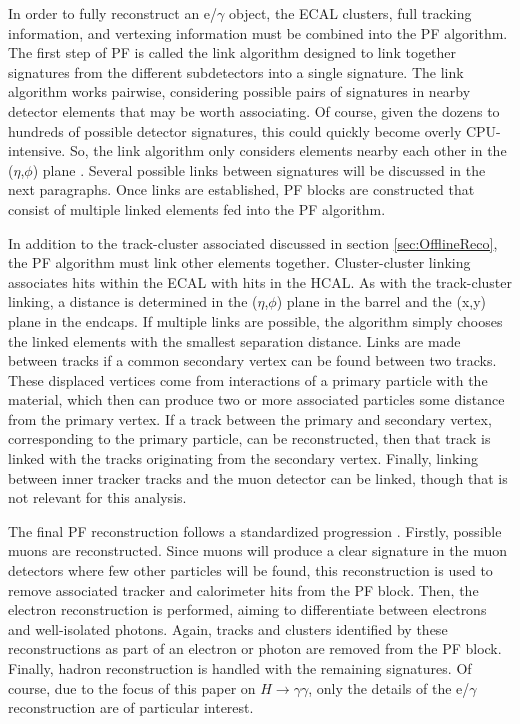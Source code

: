 \documentclass[12pt]{ucsddissertation}
\begin{document}
In order to fully reconstruct an e/$\gamma$ object, the ECAL clusters, full tracking information, and vertexing information must be combined into the PF algorithm. The first step of PF is called the link algorithm designed to link together signatures from the different subdetectors into a single signature. The link algorithm works pairwise, considering possible pairs of signatures in nearby detector elements that may be worth associating. Of course, given the dozens to hundreds of possible detector signatures, this could quickly become overly CPU-intensive. So, the link algorithm only considers elements nearby each other in the ($\eta$,$\phi$) plane \cite{ParticleFlow}. Several possible links between signatures will be discussed in the next paragraphs. Once links are established, PF blocks are constructed that consist of multiple linked elements fed into the PF algorithm.

In addition to the track-cluster associated discussed in section \ref{sec:OfflineReco}, the PF algorithm must link other elements together. Cluster-cluster linking associates hits within the ECAL with hits in the HCAL. As with the track-cluster linking, a distance is determined in the ($\eta$,$\phi$) plane in the barrel and the (x,y) plane in the endcaps. If multiple links are possible, the algorithm simply chooses the linked elements with the smallest separation distance. Links are made between tracks if a common secondary vertex can be found between two tracks. These displaced vertices come from interactions of a primary particle with the material, which then can produce two or more associated particles some distance from the primary vertex. If a track between the primary and secondary vertex, corresponding to the primary particle, can be reconstructed, then that track is linked with the tracks originating from the secondary vertex. Finally, linking between inner tracker tracks and the muon detector can be linked, though that is not relevant for this analysis.

The final PF reconstruction follows a standardized progression \cite{ParticleFlow}. Firstly, possible muons are reconstructed. Since muons will produce a clear signature in the muon detectors where few other particles will be found, this reconstruction is used to remove associated tracker and calorimeter hits from the PF block. Then, the electron reconstruction is performed, aiming to differentiate between electrons and well-isolated photons. Again, tracks and clusters identified by these reconstructions as part of an electron or photon are removed from the PF block. Finally, hadron reconstruction is handled with the remaining signatures. Of course, due to the focus of this paper on $H \rightarrow \gamma \gamma$, only the details of the e/$\gamma$ reconstruction are of particular interest.
\end{document}
